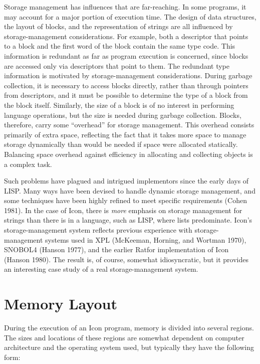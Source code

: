 Storage management has influences that are far-reaching. In some
programs, it may account for a major portion of execution time. The
design of data structures, the layout of blocks, and the
representation of strings are all influenced by storage-management
considerations. For example, both a descriptor that points to a block
and the first word of the block contain the same type code. This
information is redundant as far as program execution is concerned,
since blocks are accessed only via descriptors that point to them. The
redundant type information is motivated by storage-management
considerations. During garbage collection, it is necessary to access
blocks directly, rather than through pointers from descriptors, and it
must be possible to determine the type of a block from the block
itself.  Similarly, the size of a block is of no interest in
performing language operations, but the size is needed during garbage
collection. Blocks, therefore, carry some ``overhead'' for storage
management. This overhead consists primarily of extra space,
reflecting the fact that it takes more space to manage storage
dynamically than would be needed if space were allocated
statically. Balancing space overhead against efficiency in allocating
and collecting objects is a complex task.

Such problems have plagued and intrigued implementors since the early
days of LISP. Many ways have been devised to handle dynamic storage
management, and some techniques have been highly refined to meet
specific requirements (Cohen 1981). In the case of Icon, there is
\textit{more }emphasis on storage management for strings than there is
in a language, such as LISP, where lists predominate. Icon's
storage-management system reflects previous experience with
storage-management systems used in XPL (McKeeman, Horning, and Wortman
1970), SNOBOL4 (Hanson 1977), and the earlier Ratfor implementation of
Icon (Hanson 1980). The result is, of course, somewhat idiosyncratic,
but it provides an interesting case study of a real storage-management
system.

\section{Memory Layout}

During the execution of an Icon program, memory is divided into
several regions. The sizes and locations of these regions are somewhat
dependent on computer architecture and the operating system used, but
typically they have the following form:

